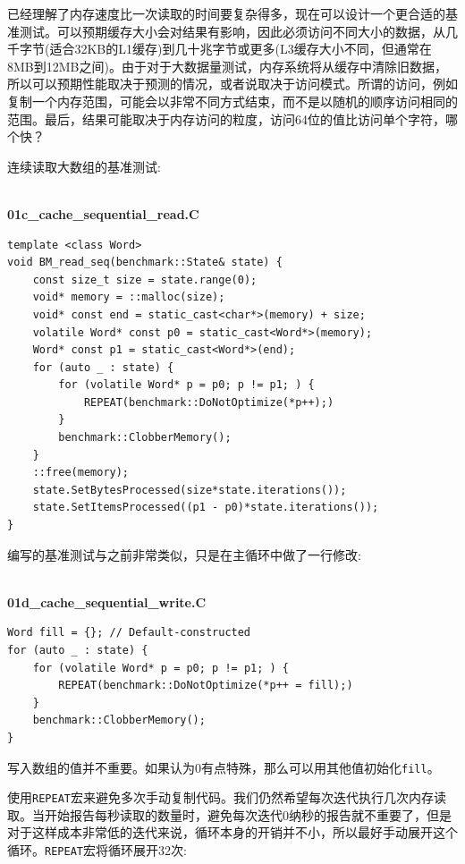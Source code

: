 
已经理解了内存速度比一次读取的时间要复杂得多，现在可以设计一个更合适的基准测试。可以预期缓存大小会对结果有影响，因此必须访问不同大小的数据，从几千字节(适合32KB的L1缓存)到几十兆字节或更多(L3缓存大小不同，但通常在8MB到12MB之间)。由于对于大数据量测试，内存系统将从缓存中清除旧数据，所以可以预期性能取决于预测的情况，或者说取决于访问模式。所谓的访问，例如复制一个内存范围，可能会以非常不同方式结束，而不是以随机的顺序访问相同的范围。最后，结果可能取决于内存访问的粒度，访问64位的值比访问单个字符，哪个快？

连续读取大数组的基准测试:

\hspace*{\fill} \\ %
\noindent
\textbf{01c\_cache\_sequential\_read.C}
\begin{lstlisting}[style=styleCXX]
template <class Word>
void BM_read_seq(benchmark::State& state) {
	const size_t size = state.range(0);
	void* memory = ::malloc(size);
	void* const end = static_cast<char*>(memory) + size;
	volatile Word* const p0 = static_cast<Word*>(memory);
	Word* const p1 = static_cast<Word*>(end);
	for (auto _ : state) {
		for (volatile Word* p = p0; p != p1; ) {
			REPEAT(benchmark::DoNotOptimize(*p++);)
		}
		benchmark::ClobberMemory();
	}
	::free(memory);
	state.SetBytesProcessed(size*state.iterations());
	state.SetItemsProcessed((p1 - p0)*state.iterations());
}
\end{lstlisting}

编写的基准测试与之前非常类似，只是在主循环中做了一行修改:

\hspace*{\fill} \\ %
\noindent
\textbf{01d\_cache\_sequential\_write.C}
\begin{lstlisting}[style=styleCXX]
Word fill = {}; // Default-constructed
for (auto _ : state) {
	for (volatile Word* p = p0; p != p1; ) {
		REPEAT(benchmark::DoNotOptimize(*p++ = fill);)
	}
	benchmark::ClobberMemory();
}
\end{lstlisting}

写入数组的值并不重要。如果认为0有点特殊，那么可以用其他值初始化\texttt{fill}。

使用\texttt{REPEAT}宏来避免多次手动复制代码。我们仍然希望每次迭代执行几次内存读取。当开始报告每秒读取的数量时，避免每次迭代0纳秒的报告就不重要了，但是对于这样成本非常低的迭代来说，循环本身的开销并不小，所以最好手动展开这个循环。\texttt{REPEAT}宏将循环展开32次:

